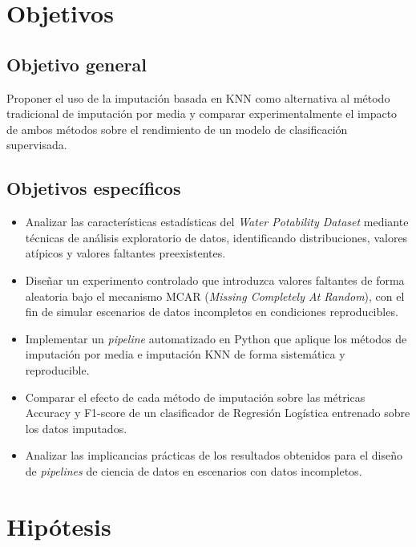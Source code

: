 \section{Objetivos}

\subsection{Objetivo general}

Proponer el uso de la imputación basada en KNN como alternativa al método tradicional de imputación por media y comparar experimentalmente el impacto de ambos métodos sobre el rendimiento de un modelo de clasificación supervisada.

\subsection{Objetivos específicos}

\begin{itemize}
    \item Analizar las características estadísticas del \textit{Water
          Potability Dataset} mediante técnicas de análisis exploratorio
          de datos, identificando distribuciones, valores atípicos y
          valores faltantes preexistentes.

    \item Diseñar un experimento controlado que introduzca valores faltantes
          de forma aleatoria bajo el mecanismo MCAR (\textit{Missing
          Completely At Random}), con el fin de simular escenarios de
          datos incompletos en condiciones reproducibles.

    \item Implementar un \textit{pipeline} automatizado en Python que aplique los
          métodos de imputación por media e imputación KNN de forma
          sistemática y reproducible.

    \item Comparar el efecto de cada método de imputación sobre las
          métricas Accuracy y F1-score de un clasificador de Regresión
          Logística entrenado sobre los datos imputados.

    \item Analizar las implicancias prácticas de los resultados obtenidos
          para el diseño de \textit{pipelines} de ciencia de datos en escenarios
          con datos incompletos.
\end{itemize}

\section{Hipótesis}

